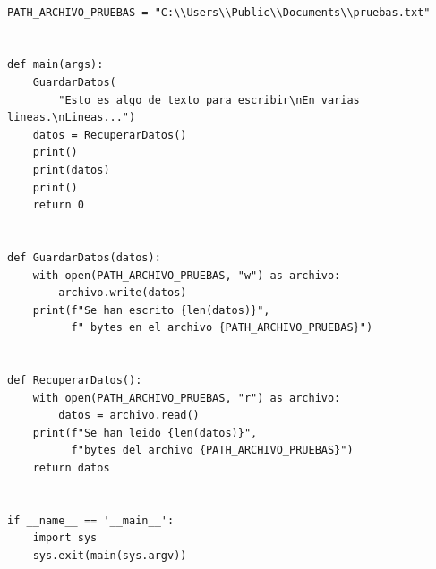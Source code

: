 \documentclass[spanish,12pt,a4paper,final,oneside]{book}
\begin{document}
\begin{lstlisting}[frame=single, caption=lenguaje Python]

PATH_ARCHIVO_PRUEBAS = "C:\\Users\\Public\\Documents\\pruebas.txt"


def main(args):
    GuardarDatos(
        "Esto es algo de texto para escribir\nEn varias lineas.\nLineas...")
    datos = RecuperarDatos()
    print()
    print(datos)
    print()
    return 0


def GuardarDatos(datos):
    with open(PATH_ARCHIVO_PRUEBAS, "w") as archivo:
        archivo.write(datos)
    print(f"Se han escrito {len(datos)}",
          f" bytes en el archivo {PATH_ARCHIVO_PRUEBAS}")


def RecuperarDatos():
    with open(PATH_ARCHIVO_PRUEBAS, "r") as archivo:
        datos = archivo.read()
    print(f"Se han leido {len(datos)}",
          f"bytes del archivo {PATH_ARCHIVO_PRUEBAS}")
    return datos


if __name__ == '__main__':
    import sys
    sys.exit(main(sys.argv))

\end{lstlisting}
\end{document}
